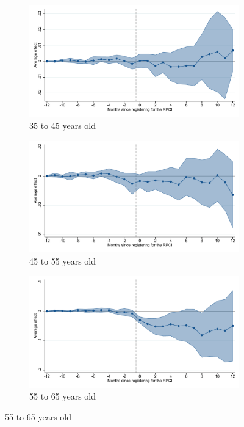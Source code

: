 \begin{figure}[H]
    \begin{subfigure}{0.32\textwidth}
    \caption{35 to 45 years old}
    \includegraphics[width=\textwidth]{04_Figures/muestra_10porciento/event_study_alta_age_35_45_dcdh_connected.pdf}
    \end{subfigure}
    \begin{subfigure}{0.32\textwidth}
    \caption{45 to 55 years old}
    \includegraphics[width=\textwidth]{04_Figures/muestra_10porciento/event_study_alta_age_45_55_dcdh_connected.pdf}
    \end{subfigure}
    \begin{subfigure}{0.32\textwidth}
    \caption{55 to 65 years old}
    \includegraphics[width=\textwidth]{04_Figures/muestra_10porciento/event_study_alta_age_55_65_dcdh_connected.pdf}
    \end{subfigure}


\end{figure}
